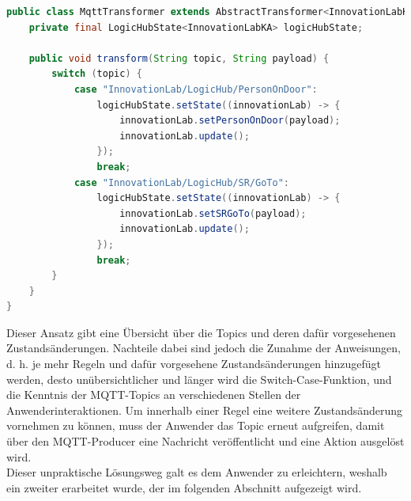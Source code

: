 \begin{lstlisting}[language=Java, frame=lines, xleftmargin=\parindent, style=algoBericht, label={code:switch-case}, captionpos=b, caption={Transformation über eine Switch-Case-Anweisung}]
public class MqttTransformer extends AbstractTransformer<InnovationLabKA> {
    private final LogicHubState<InnovationLabKA> logicHubState;

    public void transform(String topic, String payload) {
        switch (topic) {
            case "InnovationLab/LogicHub/PersonOnDoor":
                logicHubState.setState((innovationLab) -> {
                    innovationLab.setPersonOnDoor(payload);
                    innovationLab.update();
                });
                break;
            case "InnovationLab/LogicHub/SR/GoTo":
                logicHubState.setState((innovationLab) -> {
                    innovationLab.setSRGoTo(payload);
                    innovationLab.update();
                });
                break;
        }    
    }
}
\end{lstlisting}
    Dieser Ansatz gibt eine Übersicht über die Topics und deren dafür vorgesehenen Zustandsänderungen. Nachteile dabei sind jedoch die Zunahme der Anweisungen, d. h. 
    je mehr Regeln und dafür vorgesehene Zustandsänderungen hinzugefügt werden, desto unübersichtlicher und länger wird die Switch-Case-Funktion, und die 
    Kenntnis der \acs{MQTT}-Topics an verschiedenen Stellen der Anwenderinteraktionen. Um innerhalb einer Regel eine weitere Zustandsänderung vornehmen zu können, muss der 
    Anwender das Topic erneut aufgreifen, damit über den \acs{MQTT}-Producer eine Nachricht veröffentlicht und eine Aktion ausgelöst wird. 
    \\
    Dieser unpraktische Lösungsweg galt es dem Anwender zu erleichtern, weshalb ein zweiter erarbeitet wurde, der im folgenden Abschnitt 
    aufgezeigt wird.

